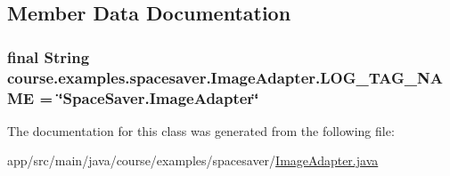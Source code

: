 \subsection{Member Data Documentation}
\hypertarget{classcourse_1_1examples_1_1spacesaver_1_1_image_adapter_a6cf088221e1ed475f35d61db7ff3f4a4}{}
\subsubsection[{L\+O\+G\+\_\+\+T\+A\+G\+\_\+\+N\+A\+M\+E}]{\setlength{\rightskip}{0pt plus 5cm}final String course.\+examples.\+spacesaver.\+Image\+Adapter.\+L\+O\+G\+\_\+\+T\+A\+G\+\_\+\+N\+A\+M\+E = \char`\"{}Space\+Saver.\+Image\+Adapter\char`\"{}\hspace{0.3cm}{\ttfamily [static]}}\label{classcourse_1_1examples_1_1spacesaver_1_1_image_adapter_a6cf088221e1ed475f35d61db7ff3f4a4}


The documentation for this class was generated from the following file\+:\begin{DoxyCompactItemize}
\item 
app/src/main/java/course/examples/spacesaver/\hyperlink{_image_adapter_8java}{Image\+Adapter.\+java}\end{DoxyCompactItemize}
